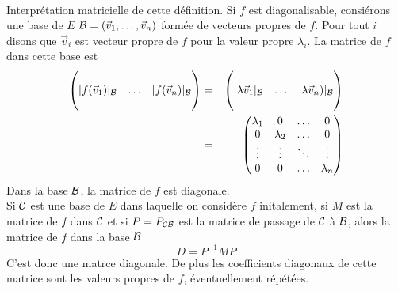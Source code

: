 \paragraph{} Interprétation matricielle de cette définition. Si $f$ est diagonalisable, consiérons une base de $E$ $\mathcal{B} = (\vec{v}_1, \ldots, \vec{v}_n)$ formée de vecteurs propres de $f$.  Pour tout $i$ disons que $\vec{v}_i$ est vecteur propre de $f$ pour la valeur propre $\lambda_i$. La matrice de $f$ dans cette base est
\begin{eqnarray*}
  \begin{pmatrix} \\ [f(\vec{v}_1)]_{\mathcal{B}} & \ldots & [f(\vec{v}_n)]_{\mathcal{B}} \\ \\ \end{pmatrix} &=& 
    \begin{pmatrix} \\ [\lambda \vec{v}_1]_{\mathcal{B}} & \ldots & [\lambda \vec{v}_n)]_{\mathcal{B}} \\ \\ \end{pmatrix} \\
    &=& \begin{pmatrix} 
      \lambda_1 & 0 & \ldots & 0 \\
      0 & \lambda_2 & \ldots & 0 \\
      \vdots & \vdots & \ddots & \vdots \\
      0 & 0 & \ldots & \lambda_n \\
    \end{pmatrix}
\end{eqnarray*}
Dans la base $\mathcal{B}$, la matrice de $f$ est diagonale. \\
Si $\mathcal{C}$ est une base de $E$ dans laquelle on considère $f$ initalement, si $M$ est la matrice de $f$ dans $\mathcal{C}$ et si $P = P_{\mathcal{C} \mathcal{B}}$ est la matrice de passage de $\mathcal{C}$ à $\mathcal{B}$, alors la matrice de $f$ dans la base $\mathcal{B}$ 
$$D = P^{-1} M P$$
C'est donc une  matrce diagonale. De plus les coefficients diagonaux de cette matrice sont les valeurs propres de $f$, éventuellement répétées.

